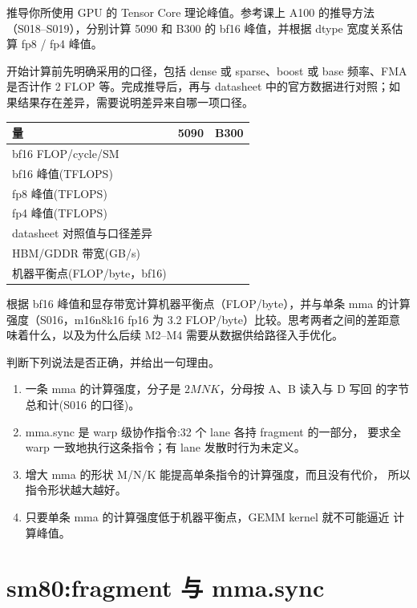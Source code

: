 \documentclass[11pt,a4paper,fontset=fandol]{ctexart}
\begin{document}

推导你所使用 GPU 的 Tensor Core 理论峰值。参考课上 A100
的推导方法（S018--S019），分别计算 5090 和 B300 的 bf16 峰值，并根据
dtype 宽度关系估算 fp8 / fp4 峰值。

开始计算前先明确采用的口径，包括 dense 或 sparse、boost 或 base
频率、FMA 是否计作 2 FLOP 等。完成推导后，再与 datasheet
中的官方数据进行对照；如果结果存在差异，需要说明差异来自哪一项口径。

\begin{longtable}[]{@{}lll@{}}
\toprule\noalign{}
量 & 5090 & B300 \\
\midrule\noalign{}
\endhead
\bottomrule\noalign{}
\endlastfoot
bf16 FLOP/cycle/SM & & \\
bf16 峰值(TFLOPS) & & \\
fp8 峰值(TFLOPS) & & \\
fp4 峰值(TFLOPS) & & \\
datasheet 对照值与口径差异 & & \\
HBM/GDDR 带宽(GB/s) & & \\
机器平衡点(FLOP/byte，bf16) & & \\
\end{longtable}

根据 bf16 峰值和显存带宽计算机器平衡点（FLOP/byte），并与单条 mma
的计算强度（S016，m16n8k16 fp16 为 3.2
FLOP/byte）比较。思考两者之间的差距意味着什么，以及为什么后续 M2--M4
需要从数据供给路径入手优化。


判断下列说法是否正确，并给出一句理由。

\begin{enumerate}
\def\labelenumi{(\alph{enumi})}
\item
  一条 mma 的计算强度，分子是 \(2MNK\)，分母按 A、B 读入与 D 写回
  的字节总和计(S016 的口径)。
\item
  mma.sync 是 warp 级协作指令:32 个 lane 各持 fragment 的一部分， 要求全
  warp 一致地执行这条指令；有 lane 发散时行为未定义。
\item
  增大 mma 的形状 M/N/K 能提高单条指令的计算强度，而且没有代价，
  所以指令形状越大越好。
\item
  只要单条 mma 的计算强度低于机器平衡点，GEMM kernel 就不可能逼近
  计算峰值。
\end{enumerate}

\section{sm80:fragment 与 mma.sync}\label{sm80fragment-ux4e0e-mma.sync}
\end{document}
